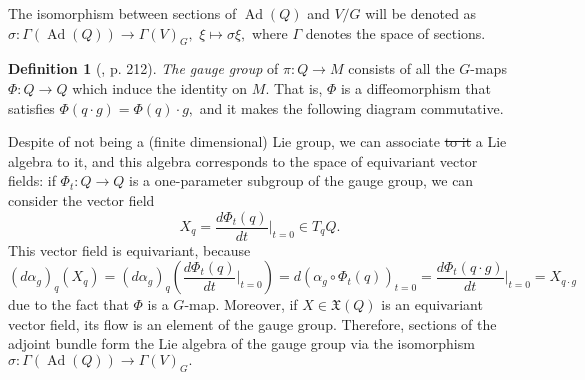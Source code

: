 \documentclass[12pt, letterpaper, reqno]{amsart}
\theoremstyle{definition}
\newtheorem{df}{Definition}
\theoremstyle{plain}
\theoremstyle{remark}
\providecommand{\DIFdel}[1]{{\protect\color{red}\sout{#1}}}                      %
\providecommand{\DIFdelbegin}{} %
\providecommand{\DIFdelend}{} %
\newcommand{\DIFscaledelfig}{0.5}
\newlength{\DIFdelgraphicswidth} %
\newlength{\DIFdelgraphicsheight} %
\newcommand{\DIFdelincludegraphics}[2][]{%
\sbox{\DIFdelgraphicsbox}{\DIFOincludegraphics[#1]{#2}}%
\settoboxwidth{\DIFdelgraphicswidth}{\DIFdelgraphicsbox} %
\settoboxtotalheight{\DIFdelgraphicsheight}{\DIFdelgraphicsbox} %
\scalebox{\DIFscaledelfig}{%
\parbox[b]{\DIFdelgraphicswidth}{\usebox{\DIFdelgraphicsbox}\\[-\baselineskip] \rule{\DIFdelgraphicswidth}{0em}}\llap{\resizebox{\DIFdelgraphicswidth}{\DIFdelgraphicsheight}{%
\setlength{\unitlength}{\DIFdelgraphicswidth}%
\begin{picture}(1,1)%
\thicklines\linethickness{2pt} %
{\color[rgb]{1,0,0}\put(0,0){\framebox(1,1){}}}%
{\color[rgb]{1,0,0}\put(0,0){\line( 1,1){1}}}%
{\color[rgb]{1,0,0}\put(0,1){\line(1,-1){1}}}%
\end{picture}%
}\hspace*{3pt}}} %
} %
\DeclareRobustCommand{\DIFdelbegin}{\DIFOdelbegin \let\includegraphics\DIFdelincludegraphics} %
\DeclareRobustCommand{\DIFdelend}{\DIFOaddend \let\includegraphics\DIFOincludegraphics} %
\begin{document}
The isomorphism between sections of $ \operatorname{Ad} (Q) $ and $ V/G $ will be denoted as $ \sigma: \Gamma( \operatorname{Ad} (Q)) \rightarrow \Gamma(V)_G, $ $ \xi \mapsto \sigma\xi, $ where $ \Gamma $ denotes the space of sections.

\begin{df}[\cite{montgomery2002tour}, p. 212]
	\textit{The gauge group} of $ \pi: Q \rightarrow M $ consists of all the $ G $-maps $ \Phi: Q \rightarrow  Q$ which induce the identity on $ M. $ That is, $ \Phi $ is a diffeomorphism that satisfies $ \Phi(q\cdot g) =\Phi(q)\cdot g, $ and it makes the following diagram commutative.
	\begin{center}
	\end{center}
\end{df}
Despite of not being a (finite dimensional) Lie group, we can associate \DIFdelbegin \DIFdel{to it }\DIFdelend a Lie algebra to it, and this algebra corresponds to the space of equivariant vector fields: if $ \Phi_t: Q \rightarrow Q $ is a one-parameter subgroup of the gauge group, we can consider the vector field $$ X_q = \frac{d \Phi_t(q)}{dt} \Big|_{t=0}\in T_qQ. $$ This vector field is equivariant, because $$ (d\alpha_g)_q(X_q)=(d\alpha_g)_q \left( \frac{d \Phi_t(q)}{dt} \Big|_{t=0} \right)= d(\alpha_g \circ \Phi_t(q))_{t=0}= \frac{d\Phi_t(q\cdot g)}{dt} \Big|_{t=0}=X_{q\cdot g}  $$
due to the fact that $ \Phi $ is a $ G $-map. Moreover, if $ X\in \mathfrak{X}(Q) $ is an equivariant vector field, its flow is an element of the gauge group. Therefore, sections of the adjoint bundle form the Lie algebra of the gauge group via the isomorphism $ \sigma: \Gamma( \operatorname{Ad} (Q)) \rightarrow  \Gamma(V)_G. $ 
\end{document}

